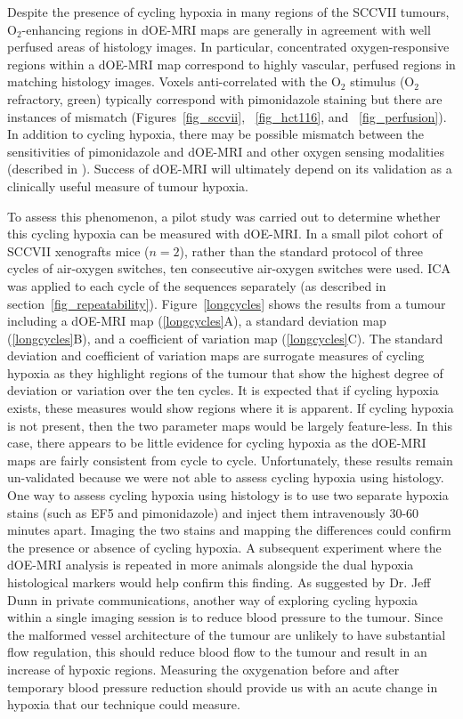 Despite the presence of cycling hypoxia in many regions of the SCCVII tumours, O$_2$-enhancing regions in \acs{dOE-MRI} maps are generally in agreement with well perfused areas of histology images.
In particular, concentrated oxygen-responsive regions within a \acs{dOE-MRI} map correspond to highly vascular, perfused regions in matching histology images.
Voxels anti-correlated with the O$_2$ stimulus (O$_2$ refractory, green) typically correspond with pimonidazole staining but there are instances of mismatch (Figures~\ref{fig_sccvii}, ~\ref{fig_hct116}, and ~\ref{fig_perfusion}).
In addition to cycling hypoxia, there may be possible mismatch between the sensitivities of pimonidazole and dOE-MRI and other oxygen sensing modalities (described in \cite{Horsman:2012kw}).
Success of \acs{dOE-MRI} will ultimately depend on its validation as a clinically useful measure of tumour hypoxia.

To assess this phenomenon, a pilot study was carried out to determine whether this cycling hypoxia can be measured with \acs{dOE-MRI}.
In a small pilot cohort of SCCVII xenografts mice ($n=2$), rather than the standard protocol of three cycles of air-oxygen switches, ten consecutive air-oxygen switches were used.
\acs{ICA} was applied to each cycle of the sequences separately (as described in section~\ref{fig_repeatability}).
Figure~\ref{longcycles} shows the results from a tumour including a \acs{dOE-MRI} map (\ref{longcycles}A), a standard deviation map (\ref{longcycles}B), and a coefficient of variation map (\ref{longcycles}C).
The standard deviation and coefficient of variation maps are surrogate measures of cycling hypoxia as they highlight regions of the tumour that show the highest degree of deviation or variation over the ten cycles.
It is expected that if cycling hypoxia exists, these measures would show regions where it is apparent. 
If cycling hypoxia is not present, then the two parameter maps would be largely feature-less.
In this case, there appears to be little evidence for cycling hypoxia as the \acs{dOE-MRI} maps are fairly consistent from cycle to cycle.
Unfortunately, these results remain un-validated because we were not able to assess cycling hypoxia using histology.
One way to assess cycling hypoxia using histology is to use two separate hypoxia stains (such as EF5 and pimonidazole) and inject them intravenously 30-60 minutes apart.
Imaging the two stains and mapping the differences could confirm the presence or absence of cycling hypoxia. 
A subsequent experiment where the \acs{dOE-MRI} analysis is repeated in more animals alongside the dual hypoxia histological markers would help confirm this finding.
As suggested by Dr. Jeff Dunn in private communications, another way of exploring cycling hypoxia within a single imaging session is to reduce blood pressure to the tumour. 
Since the malformed vessel architecture of the tumour are unlikely to have substantial flow regulation, this should reduce blood flow to the tumour and result in an increase of hypoxic regions.
Measuring the oxygenation before and after temporary blood pressure reduction should provide us with an acute change in hypoxia that our technique could measure.

